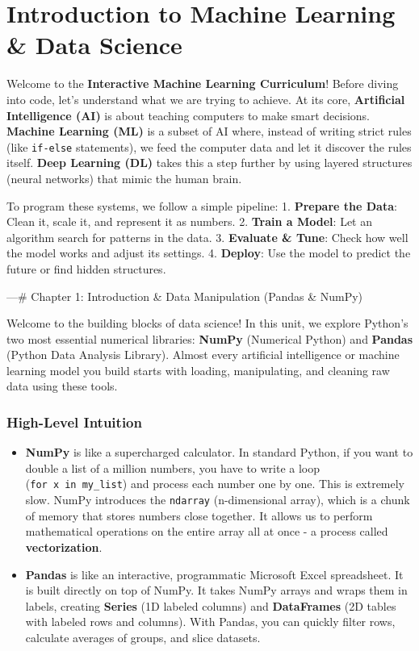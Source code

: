 \section{Introduction to Machine Learning \& Data
Science}\label{introduction-to-machine-learning-data-science}

Welcome to the \textbf{Interactive Machine Learning Curriculum}! Before
diving into code, let's understand what we are trying to achieve. At its
core, \textbf{Artificial Intelligence (AI)} is about teaching computers
to make smart decisions. \textbf{Machine Learning (ML)} is a subset of
AI where, instead of writing strict rules (like \texttt{if-else}
statements), we feed the computer data and let it discover the rules
itself. \textbf{Deep Learning (DL)} takes this a step further by using
layered structures (neural networks) that mimic the human brain.

To program these systems, we follow a simple pipeline: 1.
\textbf{Prepare the Data}: Clean it, scale it, and represent it as
numbers. 2. \textbf{Train a Model}: Let an algorithm search for patterns
in the data. 3. \textbf{Evaluate \& Tune}: Check how well the model
works and adjust its settings. 4. \textbf{Deploy}: Use the model to
predict the future or find hidden structures.

---\n\n\# Chapter 1: Introduction \& Data Manipulation (Pandas \& NumPy)

Welcome to the building blocks of data science! In this unit, we explore
Python's two most essential numerical libraries: \textbf{NumPy}
(Numerical Python) and \textbf{Pandas} (Python Data Analysis Library).
Almost every artificial intelligence or machine learning model you build
starts with loading, manipulating, and cleaning raw data using these
tools.

\subsubsection{High-Level Intuition}\label{high-level-intuition}

\begin{itemize}
\tightlist
\item
  \textbf{NumPy} is like a supercharged calculator. In standard Python,
  if you want to double a list of a million numbers, you have to write a
  loop (\texttt{for\ x\ in\ my\_list}) and process each number one by
  one. This is extremely slow. NumPy introduces the \texttt{ndarray}
  (n-dimensional array), which is a chunk of memory that stores numbers
  close together. It allows us to perform mathematical operations on the
  entire array all at once - a process called \textbf{vectorization}.
\item
  \textbf{Pandas} is like an interactive, programmatic Microsoft Excel
  spreadsheet. It is built directly on top of NumPy. It takes NumPy
  arrays and wraps them in labels, creating \textbf{Series} (1D labeled
  columns) and \textbf{DataFrames} (2D tables with labeled rows and
  columns). With Pandas, you can quickly filter rows, calculate averages
  of groups, and slice datasets.
\end{itemize}

